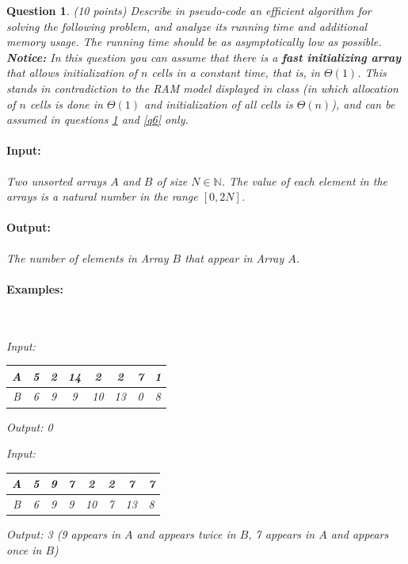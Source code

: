 \documentclass[a4paper]{article}
\theoremstyle{remarksStyle}
\theoremstyle{questionStyle}
\newtheorem{question}{Question}
\theoremstyle{answerStyle}
\begin{document}
\begin{question} (10 points)
\label{q5:a}
Describe in pseudo-code an efficient algorithm for solving the following problem, and analyze its running time and additional memory usage. The running time should be as asymptotically low as possible.
\\
\textbf{Notice:} In this question you can assume that there is a \textbf{fast initializing array} that allows initialization of $n$ cells in a constant time, that is, in $\Theta(1)$.
This stands in contradiction to the RAM model displayed in class (in which allocation of $n$ cells is done in $\Theta(1)$ and initialization of all cells is $\Theta(n)$), and can be assumed in questions \ref{q5:a} and \ref{q6} only.
\paragraph{Input:} Two unsorted arrays $A$ and $B$ of size $N\in \mathbb {N}$. The value of each element in the arrays is a natural number in the range $[0,2N]$.
\paragraph{Output:} The number of elements in Array $B$ that appear in Array $A$. 

\paragraph{Examples:} $ $
\vspace{0.5cm}

Input:
\begin{tabular}{|c || c | c  | c | c | c | c | c ||} 
 \hline
 A & 5 & 2 & 14 & 2 & 2 & 7 & 1  \\ 
 \hline
 B & 6 & 9 & 9 & 10 & 13 & 0 & 8\\
 \hline
\end{tabular}

\vspace{0.5cm}
Output: 0


\vspace{1cm}
Input:
\begin{tabular}{|c || c | c  | c | c | c | c | c ||} 
 \hline
 A & 5 & 9 & 7 & 2 & 2 & 7 & 7  \\ 
 \hline
 B & 6 & 9 & 9 & 10 & 7 & 13 & 8\\
 \hline
\end{tabular}

\vspace{0.5cm}
Output:  3 \hspace{1cm} (\textit{9 appears in $A$ and appears twice in $B$,  7 appears in $A$  and appears once in $B$})



\end{question}
\end{document}
